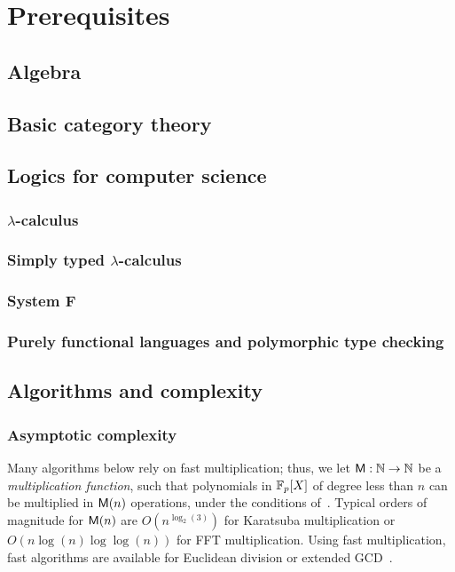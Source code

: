 

\part{Prerequisites}

\chapter{Algebra}
\label{cha:algebra}


\chapter{Basic category theory}
\label{cha:basic-categ-theory}


\chapter{Logics for computer science}
\label{cha:logics-comp-science}
\section{$\lambda$-calculus}
\label{sec:lambda-calculus}
\section{Simply typed $\lambda$-calculus}
\label{sec:simply-typed-lambda}
\section{System F}
\label{sec:system-f}
\section{Purely functional languages and polymorphic type checking}
\label{sec:purely-funct-lang}


\chapter{Algorithms and complexity}
\label{cha:algor-compl}
\section{Asymptotic complexity}
Many algorithms below rely on fast multiplication; thus, we let $\mathsf{M}
: \mathbb{N} \rightarrow \mathbb{N}$ be a {\em multiplication function}, such that
polynomials in $\mathbb{F}_p[X]$ of degree less than $n$ can be multiplied in
$\mathsf{M}(n)$ operations, under the conditions of~\cite[Ch.~8.3]{vzGG}.
Typical orders of magnitude for $\mathsf{M}(n)$ are $O(n^{\log_2(3)})$ for
Karatsuba multiplication or $O(n\log (n) \log\log (n))$ for FFT
multiplication. Using fast multiplication, fast algorithms are
available for Euclidean division or extended GCD~\cite[Ch.~9 \&
11]{vzGG}.

